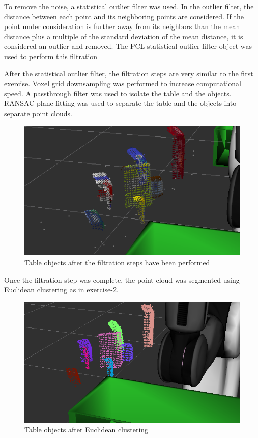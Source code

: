 \documentclass{article}
\begin{document}
To remove the noise, a statistical outlier filter was used. In the outlier filter, the distance between each point and its neighboring points are considered. If the point under consideration is further away from its neighbors than the mean distance plus a multiple of the standard deviation of the mean distance, it is considered an outlier and removed. The PCL statistical outlier filter object was used to perform this filtration

After the statistical outlier filter, the filtration steps are very similar to the first exercise. Voxel grid downsampling was performed to increase computational speed. A passthrough filter was used to isolate the table and the objects. RANSAC plane fitting was used to separate the table and the objects into separate point clouds.

\begin{figure}[H]
    \includegraphics[width=\linewidth]{pr2objects.png}
    \caption{Table objects after the filtration steps have been performed}
    \label{fig:pr2objects}
\end{figure}

Once the filtration step was complete, the point cloud was segmented using Euclidean clustering as in exercise-2.

\begin{figure}[H]
    \includegraphics[width=\linewidth]{pr2cluster.png}
    \caption{Table objects after Euclidean clustering}
    \label{fig:pr2cluster}
\end{figure}
\end{document}
